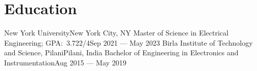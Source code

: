 \section{Education}
\resumeSubHeadingListStart
\resumeHeadingFour
{New York University}{New York City, NY}
{Master of Science in Electrical Engineering;  GPA:\ 3.722/4}{Sep 2021 --- May 2023}
\resumeHeadingFour
{Birla Institute of Technology and Science, Pilani}{Pilani, India}
{Bachelor of Engineering in Electronics and Instrumentation}{Aug 2015 --- May 2019}
\resumeSubHeadingListEnd